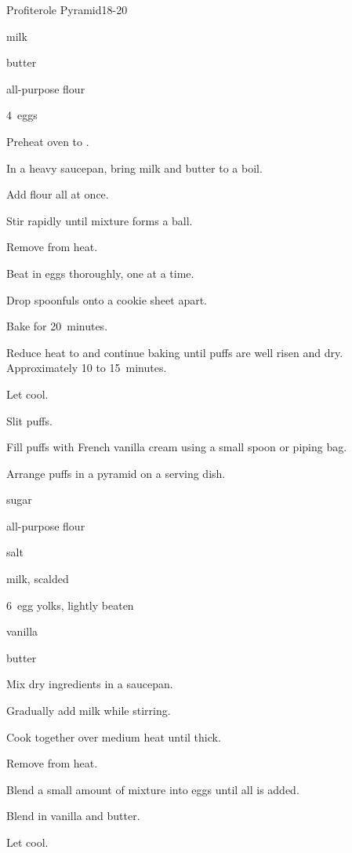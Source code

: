 \begin{recipe}{Profiterole Pyramid}{}{18-20}

\begin{ingredients}
\item {} milk
\item \C{\half} butter
\item {} all-purpose flour
\item 4~eggs
\end{ingredients}

\begin{directions}
\item Preheat oven to .
\item In a heavy saucepan, bring milk and butter to a boil.
\item Add flour all at once.
\item Stir rapidly until mixture forms a ball.
\item Remove from heat.
\item Beat in eggs thoroughly, one at a time.
\item Drop spoonfuls onto a cookie sheet  apart.
\item Bake for 20~minutes.
\item Reduce heat to  and continue baking until puffs are well risen and dry. Approximately 10 to 15~minutes.
\item Let cool.
\item Slit puffs.
\item Fill puffs with French vanilla cream using a small spoon or piping bag.
\item Arrange puffs in a pyramid on a serving dish.
\end{directions}

\begin{ingredients}
\item \C{\twothird} sugar
\item \C{\half} all-purpose flour
\item \tp{\half} salt
\item {} milk, scalded
\item 6~egg yolks, lightly beaten
\item {} vanilla
\item {} butter
\end{ingredients}

\begin{directions}
\item Mix dry ingredients in a saucepan.
\item Gradually add milk while stirring.
\item Cook together over medium heat until thick.
\item Remove from heat.
\item Blend a small amount of mixture into eggs until all is added.
\item Blend in vanilla and butter.
\item Let cool.
\end{directions}
\end{recipe}

